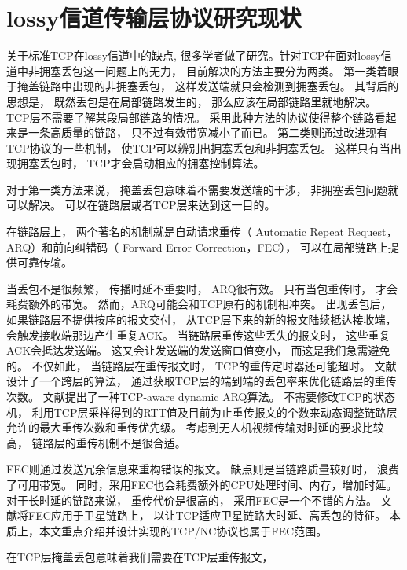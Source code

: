 \section{lossy信道传输层协议研究现状}
\par
关于标准TCP在lossy信道中的缺点,
很多学者做了研究\textsuperscript{\cite{Balakrishnan1997,ontcp,YE2005,tcpsatelite,OpenIssues}}。针对TCP在面对lossy信道中非拥塞丢包这一问题上的无力，
目前解决的方法主要分为两类。
第一类着眼于掩盖链路中出现的非拥塞丢包，
这样发送端就只会检测到拥塞丢包。
其背后的思想是，
既然丢包是在局部链路发生的， 
那么应该在局部链路里就地解决。
TCP层不需要了解某段局部链路的情况。
采用此种方法的协议使得整个链路看起来是一条高质量的链路，
只不过有效带宽减小了而已。
第二类则通过改进现有TCP协议的一些机制，
使TCP可以辨别出拥塞丢包和非拥塞丢包。
这样只有当出现拥塞丢包时，
TCP才会启动相应的拥塞控制算法。
\par
对于第一类方法来说，
掩盖丢包意味着不需要发送端的干涉，
非拥塞丢包问题就可以解决。
可以在链路层或者TCP层来达到这一目的。
\par
在链路层上，
两个著名的机制就是自动请求重传（ Automatic Repeat Request，ARQ）和前向纠错码（ Forward Error Correction，FEC），
可以在局部链路上提供可靠传输\textsuperscript{\cite{1607897,1599400,1603715}}。
\par
当丢包不是很频繁，
传播时延不重要时，
ARQ很有效。
只有当包重传时，
才会耗费额外的带宽。
然而，ARQ可能会和TCP原有的机制相冲突\textsuperscript{\cite{Balakrishnan1997}}。
出现丢包后，
如果链路层不提供按序的报文交付，
从TCP层下来的新的报文陆续抵达接收端，
会触发接收端那边产生重复ACK。
当链路层重传这些丢失的报文时，
这些重复ACK会抵达发送端。
这又会让发送端的发送窗口值变小，
而这是我们急需避免的。
不仅如此，
当链路层在重传报文时，
TCP的重传定时器还可能超时。
文献\cite{Vacirca2003On}设计了一个跨层的算法，
通过获取TCP层的端到端的丢包率来优化链路层的重传次数。
文献\cite{crosslayer}提出了一种TCP-aware dynamic ARQ算法。
不需要修改TCP的状态机，
利用TCP层采样得到的RTT值及目前为止重传报文的个数来动态调整链路层允许的最大重传次数和重传优先级。
考虑到无人机视频传输对时延的要求比较高，
链路层的重传机制不是很合适。
\par
FEC则通过发送冗余信息来重构错误的报文。
缺点则是当链路质量较好时，
浪费了可用带宽。
同时，采用FEC也会耗费额外的CPU处理时间、内存，增加时延。
对于长时延的链路来说，
重传代价是很高的，
采用FEC是一个不错的方法。
文献\cite{Allman1999Enhancing}将FEC应用于卫星链路上，
以让TCP适应卫星链路大时延、高丢包的特征。
本质上，本文重点介绍并设计实现的TCP/NC协议也属于FEC范围。
\par
在TCP层掩盖丢包意味着我们需要在TCP层重传报文，
